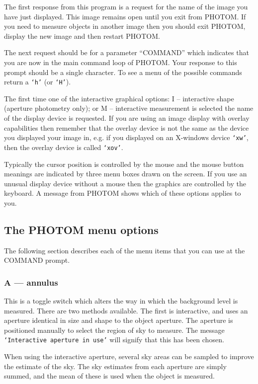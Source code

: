 \documentclass[twoside,11pt]{article}
\newcommand{\xlabel}[1]{}
\renewcommand{\_}{\texttt{\symbol{95}}}
\newcommand{\st}[1]{\texttt{`#1'}}
\begin{document}
The first response from this program is a request for the name of the
image you have just displayed. This image remains open until you exit
from PHOTOM. If you need to measure objects in another image then you
should exit PHOTOM, display the new image and then restart PHOTOM.

The next request should be for a parameter ``COMMAND'' which indicates that
you are now in the main command loop of PHOTOM. Your response to this
prompt should be a single character. To see a menu of the possible
commands return a \st{h} (or \st{H}).

The first time one of the interactive graphical options: I --
interactive shape (aperture photometry only); or M -- interactive 
measurement is selected the name of the display device is requested. 
If you are using an image display with overlay capabilities then 
remember that the overlay device is not the same as the device you 
displayed your image in, e.g. if you displayed on an X-windows device  
\st{xw}, then the overlay device is called \st{xov}.

Typically the cursor position is controlled by the mouse and the mouse
button meanings are indicated by three menu boxes drawn on the screen.
If you use an unusual display device without a mouse then the graphics
are controlled by the keyboard. A message from PHOTOM shows which of
these options applies to you.

\subsection{\xlabel{the_photom_menu_options}The PHOTOM menu options}
The following section describes each of the menu items that you can use
at the COMMAND prompt.

\subsubsection{A --- annulus}

This is a toggle switch which alters the way in which the background
level is measured. There are two methods available. The first is
interactive, and uses an aperture identical in size and shape to the
object aperture. The aperture is positioned manually to select the
region of sky to measure. The message \st{Interactive aperture in use}
will signify that this has been chosen.

When using the interactive aperture, several sky areas can be sampled
to improve the estimate of the sky. The sky estimates from each
aperture are simply summed, and the mean of these is used when the
object is measured.
\end{document}

